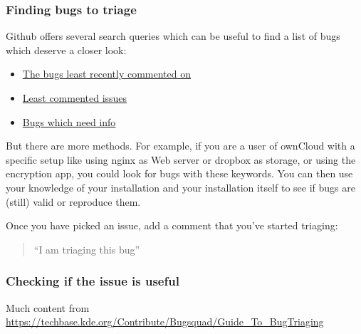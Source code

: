 \documentclass[letterpaper,10pt,english]{sphinxmanual}
\begin{document}
\subsubsection{Finding bugs to triage}
\label{bugtracker/triaging:finding-bugs-to-triage}
Github offers several search queries which can be useful to find a list of bugs which deserve a closer look:
\begin{itemize}
\item {} 
\href{https://github.com/issues?q=is\%3Aissue+user\%3Aowncloud+is\%3Aopen+sort\%3Aupdated-asc++is\%3Apublic+}{The bugs least recently commented on}

\item {} 
\href{https://github.com/issues?q=is\%3Aissue+user\%3Aowncloud+is\%3Aopen+no\%3Aassignee+no\%3Amilestone+no\%3Alabel+sort\%3Acomments-asc+}{Least commented issues}

\item {} 
\href{https://github.com/issues?q=is\%3Aissue+user\%3Aowncloud+is\%3Aopen+label\%3A\%22Needs+info\%22+sort\%3Acreated-asc+}{Bugs which need info}

\end{itemize}

But there are more methods. For example, if you are a user of ownCloud with a specific setup like using nginx as Web server or dropbox as storage, or using the encryption app, you could look for bugs with these keywords. You can then use your knowledge of your installation and your installation itself to see if bugs are (still) valid or reproduce them.

Once you have picked an issue, add a comment that you've started triaging:
\begin{quote}

``I am triaging this bug''
\end{quote}


\subsubsection{Checking if the issue is useful}
\label{bugtracker/triaging:checking-if-the-issue-is-useful}
Much content from \href{https://techbase.kde.org/Contribute/Bugsquad/Guide\_To\_BugTriaging}{https://techbase.kde.org/Contribute/Bugsquad/Guide\_To\_BugTriaging}
\end{document}
